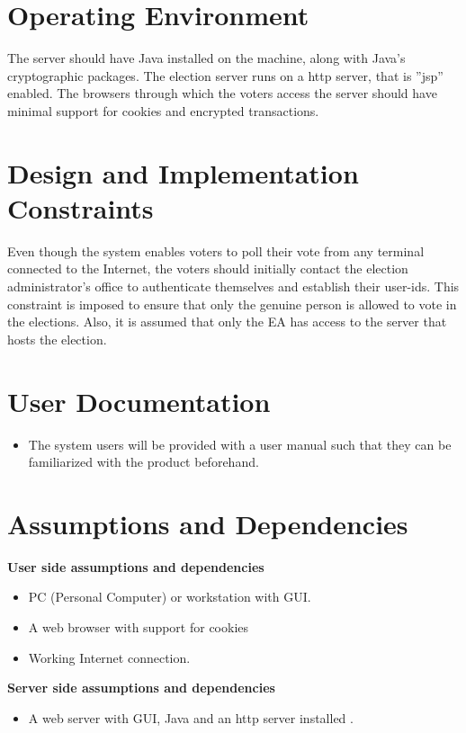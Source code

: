 \documentclass[12pt,a4paper,oneside]{report}
\begin{document}
 \section{Operating Environment}
 The server should have Java installed on the machine, along with Java’s cryptographic packages. The election server runs on a http server, that is ”jsp” enabled. The browsers through which the voters access the server should have minimal support for cookies and encrypted transactions.
 \section{Design and Implementation Constraints}
 Even though the system enables voters to poll their vote from any terminal connected to the Internet, the voters should initially contact the election administrator’s oﬃce to authenticate themselves and establish their user-ids. This constraint is imposed to ensure that only the genuine person is allowed to vote in the elections. Also, it is assumed that only the EA has access to the server that hosts the election.

\section{User Documentation}
 \begin{itemize}
 
 \item The system users will be provided with a user manual such that they can be familiarized with the product beforehand.
 \end{itemize}
 \section{Assumptions and Dependencies }
  
 \textbf{User side assumptions and dependencies}
 \begin{itemize}
\item PC (Personal Computer) or workstation with GUI.
\item A web browser with support for cookies
\item Working Internet connection.
 \end{itemize}
 \hspace{.4 in} \textbf{Server side assumptions and dependencies}
 \begin{itemize}
\item A web server with GUI, Java and an http server installed .

 \end{itemize}
\end{document}
